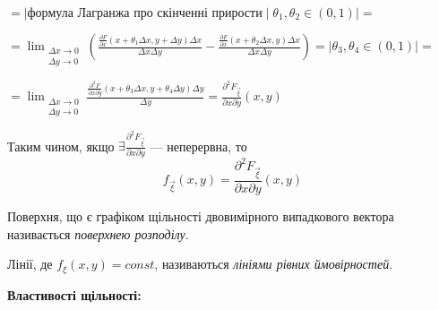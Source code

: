 $= \left|\text{формула Лагранжа про скінченні прирости}\;|
\;\theta_1, \theta_2 \in (0, 1)\right| = $

$= \lim_{\substack{\Delta x \to 0 \\ \Delta y \to 0}} 
\left(
    \frac{\frac{\partial F}{\partial x}(x + \theta_1 \Delta x, y + \Delta y)\Delta x}
    {\Delta x \Delta y}
    -
    \frac{\frac{\partial F}{\partial x}(x + \theta_2 \Delta x, y)\Delta x}
    {\Delta x \Delta y}
\right) = 
\left|\theta_3, \theta_4 \in (0, 1)\right| =$

$= \lim_{\substack{\Delta x \to 0 \\ \Delta y \to 0}}
\frac{\frac{\partial^2 F}{\partial x \partial y}(x + \theta_3 \Delta x, 
y + \theta_4 \Delta y)\Delta y}
{\Delta y} = \frac{\partial^2 F_{\vec{\xi}}}{\partial x \partial y}(x, y)$

Таким чином, якщо $\exists \frac{\partial^2 F_{\vec{\xi}}}{\partial x \partial y}$ 
--- неперервна, то
\begin{equation}
    f_{\vec{\xi}}(x, y) = \frac{\partial^2 F_{\vec{\xi}}}{\partial x \partial y}(x, y)
\end{equation}

\begin{definition}
    Поверхня, що є графіком щільності двовимірного випадкового вектора називається 
    \emph{поверхнею розподілу}.
\end{definition}
\begin{definition}
    Лінії, де $f_\xi(x, y) = const$, називаються \emph{лініями рівних ймовірностей}.
\end{definition}

\noindent\textbf{Властивості щільності: }

